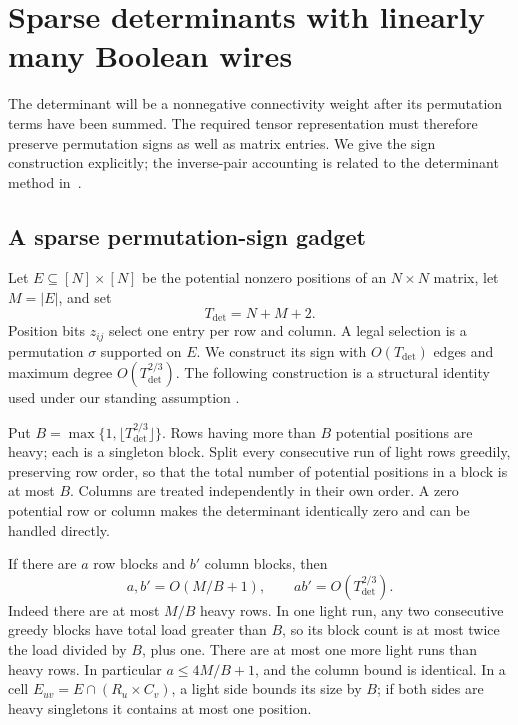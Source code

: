 \section{Sparse determinants with linearly many Boolean wires}
\label{sec:determinants}

The determinant will be a nonnegative connectivity weight after its
permutation terms have been summed. The required tensor representation
must therefore preserve permutation signs as well as matrix entries.
We give the sign construction explicitly; the inverse-pair accounting
is related to the determinant method in~\cite[Section 4]{BCKN15}.

\subsection{A sparse permutation-sign gadget}

Let $E\subseteq[N]\times[N]$ be the potential nonzero positions of
an $N\times N$ matrix, let $M=|E|$, and set
\[
 T_{\mathrm{det}}=N+M+2.
\]
Position bits $z_{ij}$ select one entry per row and column. A legal
selection is a permutation $\sigma$ supported on $E$. We construct
its sign with $O(T_{\mathrm{det}})$ edges and maximum degree
$O(T_{\mathrm{det}}^{2/3})$. The following construction is a
structural identity used under our standing assumption \HTC.

Put $B=\max\{1,\lfloor T_{\mathrm{det}}^{2/3}\rfloor\}$. Rows
having more than $B$ potential positions are heavy; each is a singleton
block. Split every consecutive run of light rows greedily, preserving
row order, so that the total number of potential positions in a block
is at most $B$. Columns are treated independently in their own order.
A zero potential row or column makes the determinant identically zero
and can be handled directly.

If there are $a$ row blocks and $b'$ column blocks, then
\begin{equation}\label{eq:block-count}
 a,b'=O(M/B+1),\qquad ab'=O(T_{\mathrm{det}}^{2/3}).
\end{equation}
Indeed there are at most $M/B$ heavy rows. In one light run, any two
consecutive greedy blocks have total load greater than $B$, so its
block count is at most twice the load divided by $B$, plus one.
There are at most one more light runs than heavy rows. In particular
$a\le4M/B+1$, and the column bound is identical. In a cell
$E_{uv}=E\cap(R_u\times C_v)$, a light side bounds its size by $B$;
if both sides are heavy singletons it contains at most one position.

